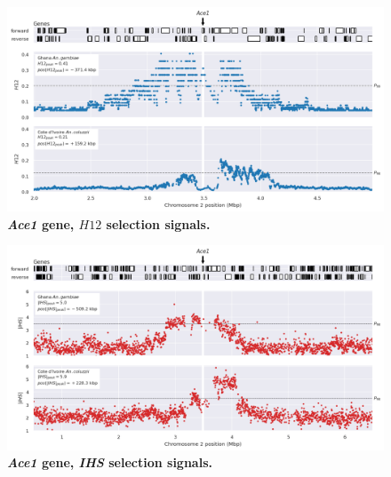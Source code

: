 \documentclass[a4paper,11pt,abstracton,hidelinks]{scrartcl}
\begin{document}
\clearpage


\begin{figure}[t!]
	\begin{center}
		\includegraphics*[width=1\linewidth,center]{artwork/locus_ace1_h12_pdist.png}
	\end{center}
	\caption[\textit{Ace1} gene, $H12$ selection signals]{
	\textbf{\textit{Ace1} gene, $H12$ selection signals.}
	} 
	\label{fig:locus_ace1_h12}
\end{figure}


\clearpage


\begin{figure}[t!]
	\begin{center}
		\includegraphics*[width=1\linewidth,center]{artwork/locus_ace1_ihs_pdist.png}
	\end{center}
	\caption[\textit{Ace1} gene, \textit{IHS} selection signals]{
	\textbf{\textit{Ace1} gene, \textit{IHS} selection signals.}
	} 
	\label{fig:locus_ace1_ihs}
\end{figure}
\end{document}
